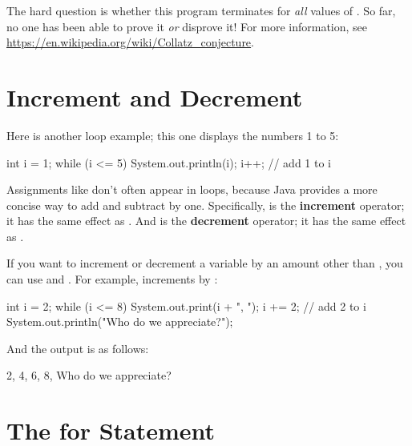 The hard question is whether this program terminates for {\em all} values of .
So far, no one has been able to prove it {\em or} disprove it!
For more information, see \url{https://en.wikipedia.org/wiki/Collatz_conjecture}.


\section{Increment and Decrement}
\label{loops-strings_increment-decrement}

Here is another  loop example; this one displays the numbers 1 to 5:

\begin{code}
int i = 1;
while (i <= 5) {
    System.out.println(i);
    i++;  // add 1 to i
}
\end{code}


Assignments like  don't often appear in loops, because Java provides a more concise way to add and subtract by one.
Specifically, \java{++} is the {\bf increment} operator; it has the same effect as .
And \java{--} is the {\bf decrement} operator; it has the same effect as .


If you want to increment or decrement a variable by an amount other than , you can use \java{+=} and \java{-=}.
For example,  increments  by :

\begin{code}
int i = 2;
while (i <= 8) {
    System.out.print(i + ", ");
    i += 2;  // add 2 to i
}
System.out.println("Who do we appreciate?");
\end{code}

And the output is as follows:

\begin{stdout}
2, 4, 6, 8, Who do we appreciate?
\end{stdout}


\section{The for Statement}
\label{loops-strings_for-statement}

